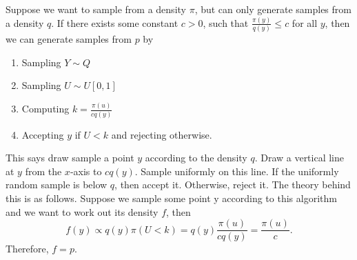 \documentclass[
]{book}
\theoremstyle{definition}
\theoremstyle{definition}
\theoremstyle{definition}
\theoremstyle{definition}
\theoremstyle{remark}
\begin{document}
Suppose we want to sample from a density \(\pi\), but can only generate samples from a density \(q\). If there exists some constant \(c > 0\), such that \(\frac{\pi(y)}{q(y)} \leq c\) for all \(y\), then we can generate samples from \(p\) by

\begin{enumerate}
\def\labelenumi{\arabic{enumi}.}
\item
  Sampling \(Y \sim Q\)
\item
  Sampling \(U \sim U[0, 1]\)
\item
  Computing \(k = \frac{\pi(u)}{cq(y)}\)
\item
  Accepting \(y\) if \(U < k\) and rejecting otherwise.
\end{enumerate}

This says draw sample a point \(y\) according to the density \(q\). Draw a vertical line at \(y\) from the \(x\)-axis to \(cq(y)\). Sample uniformly on this line. If the uniformly random sample is below \(q\), then accept it. Otherwise, reject it. The theory behind this is as follows. Suppose we sample some point y according to this algorithm and we want to work out its density \(f\), then
\[
f(y) \propto q(y)\pi(U < k) = q(y)\frac{\pi(u)}{cq(y)} = \frac{\pi(u)}{c}.
\]
Therefore, \(f = p\).
\end{document}
